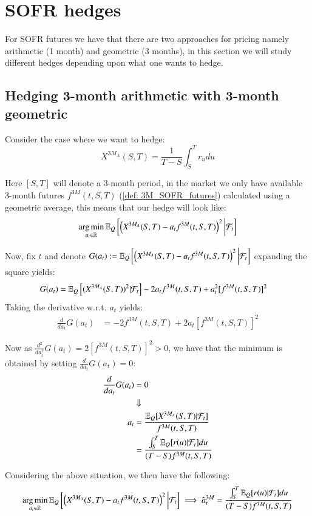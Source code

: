 \newpage 

\section{SOFR hedges}
For SOFR futures we have that there are two approaches for pricing namely arithmetic (1 month) and geometric (3 months), in this section we will study different hedges depending upon what one wants to hedge. 


\subsection{Hedging 3-month arithmetic with 3-month geometric}
Consider the case where we want to hedge: 
$$
X^{3M_{A}}(S,T) = \frac{1}{T-S}\int_{S}^{T}r_{u}du
$$

Here $[S,T]$ will denote a 3-month period, in the market we only have available
3-month futures $f^{3M}(t,S,T)$ (\ref{def: 3M_SOFR_futures})  calculated using a geometric average, this means that our hedge will look like: 
\begin{align*}
\operatorname*{arg\,min}\limits_{a_{t} \in \mathbb{R}}\mathbb{E}_{Q}\left[
\left(
X^{3M_{A}}(S,T)-a_{t}f^{3M}(t,S,T)
\right)^{2}
\bigg{|}\mathcal{F}_{t}
\right]
\end{align*}

Now, fix $t$ and denote
 $G(a_{t}) :=\mathbb{E}_{Q}\left[
\left(X^{3M_{A}}(S,T)-a_{t}f^{3M}(t,S,T)
\right)^{2}
\bigg{|}\mathcal{F}_{t}
\right]
$ 
expanding the square yields:
\begin{align*}
G(a_{t}) &= \mathbb{E}_{Q}\left[(X^{3M_{A}}(S,T))^{2}|\mathcal{F}_{t}\right] -2a_{t}f^{3M}(t,S,T) +
a_{t}^{2}[f^{3M}(t,S,T)]^{2}
\end{align*}
Taking the derivative w.r.t. $a_{t}$ yields: 
\begin{align*}
\frac{d}{da_{t}}G(a_{t}) &= -2f^{3M}(t,S,T) + 2a_{t}[f^{3M}(t,S,T)]^{2}  
\end{align*} 

Now as $\frac{d^{2}}{da_{t}^{2}}G(a_{t}) = 2[f^{3M}(t,S,T)]^{2} > 0$, we have that the minimum is obtained by setting $\frac{d}{da_{t}}G(a_{t}) = 0$:
\begin{align*}
\frac{d}{da_{t}}G(a_{t}) &= 0 \\ 
&\Downarrow \\ 
a_{t} &= \frac{
\mathbb{E}_{Q}[X^{3M_{A}}(S,T)|\mathcal{F}_{t}]
}{
f^{3M}(t,S,T)
} \\ 
&= \frac{
\int_{S}^{T}\mathbb{E}_{Q}[r(u)|\mathcal{F}_{t}]du
}{
(T-S)f^{3M}(t,S,T)
}
\end{align*}

\begin{result}
\label{result: optimal_SOFR_hedge_3MA_vs_3GM}
Considering the above situation, we then have the following:
\begin{align*}
\operatorname*{arg\,min}\limits_{a_{t} \in \mathbb{R}}\mathbb{E}_{Q}\left[
\left(
X^{3M_{A}}(S,T)-a_{t}f^{3M}(t,S,T)
\right)^{2}
\bigg{|}\mathcal{F}_{t}
\right] 
\implies
\hat{a}_{t}^{3M} = \frac{
\int_{S}^{T}\mathbb{E}_{Q}[r(u)|\mathcal{F}_{t}]du
}{
(T-S)f^{3M}(t,S,T)
}
\end{align*}
\end{result} 

